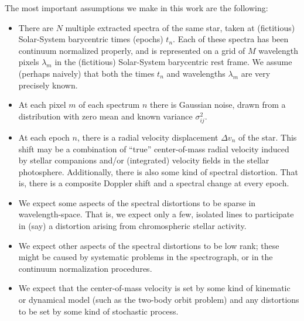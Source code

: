 \documentclass[12pt, letterpaper]{article}
\begin{document}
The most important assumptions we make in this work are the following:
\begin{itemize}\itemsep=0ex
\item There are $N$ multiple extracted spectra of the same star, taken
  at (fictitious) Solar-System barycentric times (epochs) $t_n$. Each
  of these spectra has been continuum normalized properly, and is
  represented on a grid of $M$ wavelength pixels $\lambda_m$ in the
  (fictitious) Solar-System barycentric rest frame. We assume (perhaps
  naively) that both the times $t_n$ and wavelengths $\lambda_m$ are
  very precisely known.
\item At each pixel $m$ of each spectrum $n$ there is Gaussian noise,
  drawn from a distribution with zero mean and known variance
  $\sigma^2_{ij}$.
\item At each epoch $n$, there is a radial velocity displacement
  $\Delta v_{n}$ of the star. This shift may be a combination
  of ``true'' center-of-mass radial velocity induced by stellar companions
  and/or (integrated) velocity fields in the stellar photosphere. Additionally,
  there is also some kind of spectral distortion.  That is, there is a
  composite Doppler shift and a spectral change at every epoch.
\item We expect some aspects of the spectral distortions to be sparse
  in wavelength-space.  That is, we expect only a few, isolated lines
  to participate in (say) a distortion arising from chromospheric stellar activity.
\item We expect other aspects of the spectral distortions to be low
  rank; these might be caused by systematic problems in the
  spectrograph, or in the continuum normalization procedures.
\item We expect that the center-of-mass velocity is set by some kind
  of kinematic or dynamical model (such as the two-body orbit problem)
  and any distortions to be set by some kind of stochastic process.
\end{itemize}
\end{document}
